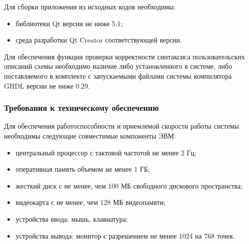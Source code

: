 Для сборки приложения из исходных кодов необходимы:
\begin{itemize}
  \item библиотеки Qt версии не ниже 5.1;
  \item среда разработки Qt Creator соответствующей версии.
\end{itemize}

Для обеспечения функции проверки корректности синтаксиса пользовательских описаний схемы необходимо наличие либо установленного в системе, либо поставляемого в комплекте с запускаемыми файлами системы компилятора GHDL версии не ниже 0.29.
%
%
\subsubsection{Требования к техническому обеспечению} \label{sec:ware:hard}
Для обеспечения работоспособности и приемлемой скорости работы системы необходимы следующие совместимые компоненты ЭВМ:
\begin{itemize}
  \item центральный процессор с тактовой частотой не менее 2 Гц;
  \item оперативная память объемом не менее 1 ГБ;
  \item жесткий диск с не менее, чем 100 МБ свободного дискового пространства;
  \item видеокарта с не менее, чем 128 МБ видеопамяти;
  \item устройства ввода: мышь, клавиатура;
  \item устройства вывода: монитор с разрешением не менее 1024 на 768 точек.
\end{itemize}